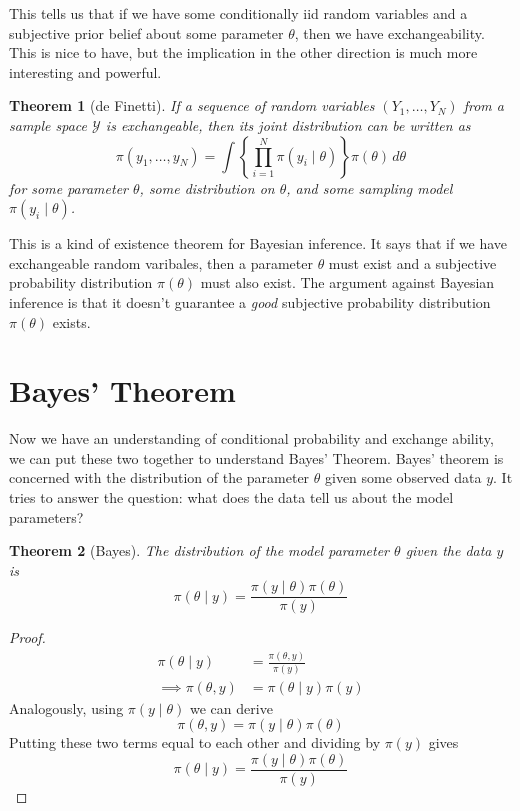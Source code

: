 \documentclass[
]{book}
\newtheorem{theorem}{Theorem}[chapter]
\theoremstyle{definition}
\theoremstyle{definition}
\theoremstyle{definition}
\theoremstyle{definition}
\theoremstyle{remark}
\begin{document}
This tells us that if we have some conditionally iid random variables and a subjective prior belief about some parameter \(\theta\), then we have exchangeability. This is nice to have, but the implication in the other direction is much more interesting and powerful.

\begin{theorem}[de Finetti]
If a sequence of random variables \((Y_1, \ldots, Y_N)\) from a sample space \(\mathcal{Y}\) is exchangeable, then its joint distribution can be written as
\[
\pi(y_1, \ldots, y_N) = \int \left\{\prod_{i=1}^N\pi(y_i \mid \theta)\right\} \pi(\theta)\, d\theta
\]
for some parameter \(\theta\), some distribution on \(\theta\), and some sampling model \(\pi(y_i \mid \theta)\).
\end{theorem}

This is a kind of existence theorem for Bayesian inference. It says that if we have exchangeable random varibales, then a parameter \(\theta\) must exist and a subjective probability distribution \(\pi(\theta)\) must also exist. The argument against Bayesian inference is that it doesn't guarantee a \emph{good} subjective probability distribution \(\pi(\theta)\) exists.

\hypertarget{bayes-theorem}{%
\section{Bayes' Theorem}\label{bayes-theorem}}

Now we have an understanding of conditional probability and exchange ability, we can put these two together to understand Bayes' Theorem. Bayes' theorem is concerned with the distribution of the parameter \(\theta\) given some observed data \(y\). It tries to answer the question: what does the data tell us about the model parameters?

\begin{theorem}[Bayes]
The distribution of the model parameter \(\theta\) given the data \(y\) is
\[
\pi(\theta \mid y) = \frac{\pi(y \mid \theta)\pi(\theta)}{\pi(y)}
\]
\end{theorem}

\begin{proof}
\begin{align}
\pi(\theta \mid y) &= \frac{\pi(\theta, y)}{\pi(y)}\\
\implies \pi(\theta, y) &= \pi(\theta \mid y)\pi(y)
\end{align}
Analogously, using \(\pi(y \mid \theta)\) we can derive
\[
\pi(\theta, y) = \pi(y \mid \theta)\pi(\theta)
\]
Putting these two terms equal to each other and dividing by \(\pi(y)\) gives
\[
\pi(\theta \mid y) = \frac{\pi(y \mid \theta)\pi(\theta)}{\pi(y)}
\]
\end{proof}
\end{document}
